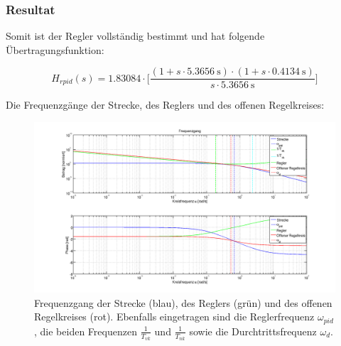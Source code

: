 \subsubsection{Resultat}

Somit ist der Regler vollst\"andig bestimmt und hat folgende \"Ubertragungsfunktion:

\begin{equation} \label{eq:pid:result}
    H_{rpid}(s) = 1.83084 \cdot \biggl[ \frac{(1 + s \cdot \SI{5.3656}{\second} ) \cdot (1 + s \cdot \SI{0.4134}{\second} ) }{ s \cdot \SI{5.3656}{\second} } \biggr]
\end{equation}

Die Frequenzg\"ange der Strecke, des Reglers und des offenen Regelkreises:

\begin{figure}[h! width=\pagewidth]
    \includegraphics[width=\textwidth]{images/pidCompletePlot.png}
    \caption{%
        Frequenzgang der Strecke (blau), des  Reglers (gr\"un) und des offenen
        Regelkreises  (rot).  Ebenfalls  eingetragen  sind die  Reglerfrequenz
        $\omega_{pid}$,   die   beiden   Frequenzen   $\frac{1}{T_{vk}}$   und
        $\frac{1}{T_{nk}}$ sowie die Durchtrittsfrequenz $\omega_d$.
    }
    \label{fig:pid_complete}
\end{figure}
\clearpage

